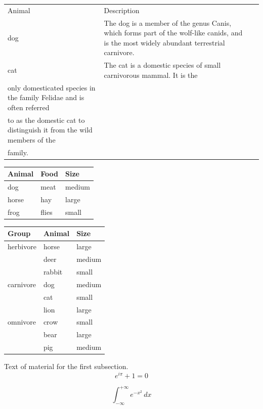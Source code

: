 \documentclass[a4paper,12pt]{book} %
\begin{document}
\begin{tabular}{lll}
  Animal & Description \\
  dog    & The dog is a member of the genus Canis, which forms part of the
  wolf-like canids, and is the most widely abundant terrestrial
  carnivore. \\
  cat    & The cat is a domestic species of small carnivorous mammal. It is the
  \\
  only domesticated species in the family Felidae and is often referred
  \\   
  to as the domestic cat to distinguish it from the wild members of the
  \\ 
  family. \\
\end{tabular}

\begin{tabular}{lll}
  \toprule
  Animal & Food  & Size   \\
  \midrule
  dog    & meat  & medium \\
  \cmidrule{1-2}
  horse  & hay   & large  \\
  \cmidrule{1-1}
  \cmidrule{3-3}
  frog   & flies & small  \\
  \bottomrule
\end{tabular}

\begin{tabular}{lll}
  \toprule
  Group     & Animal & Size   \\
  \midrule
  herbivore & horse  & large  \\
  & deer   & medium \\
  & rabbit & small  \\
  \addlinespace
  carnivore & dog    & medium \\
  & cat    & small  \\
  & lion   & large  \\
  \addlinespace
  omnivore  & crow   & small  \\
  & bear   & large  \\
  & pig    & medium \\
  \bottomrule
\end{tabular}

Text of material for the first subsection.
\begin{equation}
  e^{i\pi}+1 = 0
  \label{eq:labeltwo}
\end{equation}

\begin{equation}
  \int_{-\infty}^{+\infty} e^{-x^2} \, dx
\end{equation}
\end{document}
